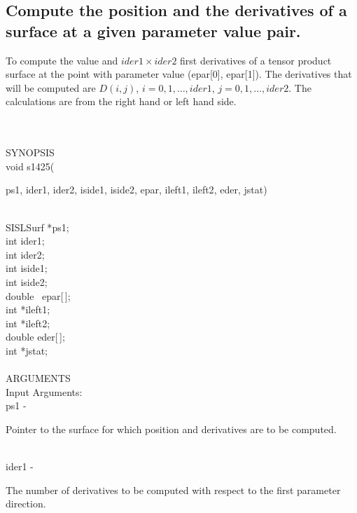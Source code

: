 \subsection{Compute the position and the derivatives of a surface at a
given parameter value pair.}
\begin{minipg1}
  To compute the value and $ider1\times ider2$ first derivatives
  of a tensor product surface at the point with parameter value
  ({\fov epar}[0], {\fov epar}[1]).
  The derivatives that will be computed are $D(i,j)$,
  $i=0,1,\dots,ider1$, $j=0,1,\dots,ider2$. The calculations are
  from the right hand or left hand side.
\end{minipg1} \\ \\
SYNOPSIS\\
        \>void s1425(\begin{minipg3}
          {\fov ps1}, {\fov ider1}, {\fov ider2}, {\fov iside1}, {\fov iside2}, {\fov epar}, {\fov ileft1}, {\fov ileft2}, {\fov eder}, {\fov jstat})
        \end{minipg3}\\
        \>\>    SISLSurf    \>  *{\fov ps1};\\
        \>\>    int    \>  {\fov ider1};\\
        \>\>    int    \>  {\fov ider2};\\
        \>\>    int    \>  {\fov iside1};\\
        \>\>    int    \>  {\fov iside2};\\
        \>\>    double \>  {\ epar}[\,];\\
        \>\>    int    \>  *{\fov ileft1};\\
        \>\>    int    \>  *{\fov ileft2};\\
        \>\>    double \>  {\fov eder}[\,];\\
        \>\>    int    \>  *{\fov jstat};\\
\\
ARGUMENTS\\
        \>Input Arguments:\\
        \>\>    {\fov ps1}\> - \>  \begin{minipg2}
                     Pointer to the surface for which position
                       and derivatives are to be computed.
                               \end{minipg2}\\[0.8ex]
        \>\>    {\fov ider1}\> - \>
        \begin{minipg2}
          The number of derivatives to be computed with respect
          to the first parameter direction.
        \end{minipg2}\\[0.8ex]
